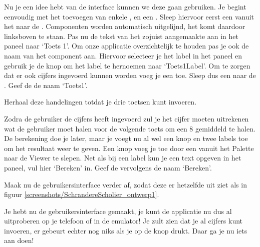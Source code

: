 Nu je een idee hebt van de interface kunnen we deze gaan gebruiken. Je begint eenvoudig met het toevoegen van enkele ,  en een . Sleep hiervoor eerst een  vanuit het  naar de . Componenten worden automatisch uitgelijnd, het  komt daardoor linksboven te staan. Pas nu de tekst van het zojuist aangemaakte  aan in het  paneel naar `Toets 1'. Om onze applicatie overzichtelijk te houden pas je ook de naam van het component aan. Hiervoor selecteer je het label in het  paneel en gebruik je de knop  om het label te hernoemen naar `Toets1Label'.
Om te zorgen dat er ook cijfers ingevoerd kunnen worden voeg je een  toe. 
Sleep dus een  naar de . Geef de  de naam `Toets1'. 

\begin{opgave}
    \opgVraag
	Herhaal deze handelingen totdat je drie toetsen kunt invoeren.
\end{opgave}

Zodra de gebruiker de cijfers heeft ingevoerd zul je het cijfer moeten uitrekenen wat de gebruiker moet halen voor de volgende toets om een 8 gemiddeld te halen. De berekening doe je later, maar je voegt nu al wel een knop en twee labels toe om het resultaat weer te geven. Een knop voeg je toe door een  vanuit het Palette naar de Viewer te slepen. Net als bij een label kun je een text opgeven in het  paneel, vul hier `Bereken' in. Geef de  vervolgens de naam `Bereken'.

\begin{opgave}
    \opgVraag
Maak nu de gebruikersinterface verder af, zodat deze er hetzelfde uit ziet als in figuur \ref{screenshots/SchrandereScholier_ontwerp1}.
\end{opgave}

\runOpTelefoon{}
Je hebt nu de gebruikersinterface gemaakt, je kunt de applicatie nu dus al uitproberen op je telefoon of in de emulator! Je zult zien dat je al cijfers kunt invoeren, er gebeurt echter nog niks als je op de knop drukt. Daar ga je nu iets aan doen!

